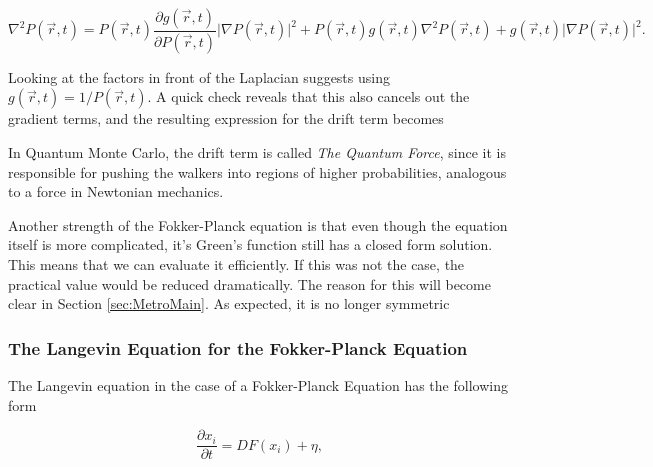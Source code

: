 \begin{equation*}
  \nabla^2 P(\vec r, t) = P(\vec r, t)\frac{\partial g(\vec r, t)}{\partial P(\vec r, t)}\Big|\nabla P(\vec r, t)\Big|^2
  + P(\vec r, t)g(\vec r, t)\nabla^2 P(\vec r, t) + g(\vec r, t) \Big|\nabla P(\vec r, t)\Big|^2.
\end{equation*}

Looking at the factors in front of the Laplacian suggests using $g(\vec r, t) = 1/P(\vec r, t)$. A quick check reveals that this also cancels out the gradient terms, and the resulting expression for the drift term becomes



In Quantum Monte Carlo, the drift term is called \textit{The Quantum Force}, since it is responsible for pushing the walkers into regions of higher probabilities, analogous to a force in Newtonian mechanics.

Another strength of the Fokker-Planck equation is that even though the equation itself is more complicated, it's Green's function still has a closed form solution. This means that we can evaluate it efficiently. If this was not the case, the practical value would be reduced dramatically. The reason for this will become clear in Section \ref{sec:MetroMain}. As expected, it is no longer symmetric 


\subsubsection{The Langevin Equation for the Fokker-Planck Equation}

The Langevin equation in the case of a Fokker-Planck Equation has the following form

\begin{equation}
 \frac{\partial x_i}{\partial t} = D F(x_i) + \eta,
\end{equation}

